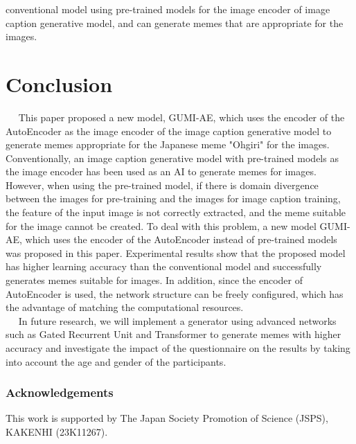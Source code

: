 \documentclass[runningheads]{llncs}
\begin{document}
conventional model using pre-trained models for the image encoder of image caption generative model, and can generate memes that are appropriate for the images.

\section{Conclusion}
~~ This paper proposed a new model, GUMI-AE, which uses the encoder of the AutoEncoder as the image encoder of the image caption generative model to generate memes appropriate for the Japanese meme "Ohgiri" for the images. Conventionally, an image caption generative model with pre-trained models as the image encoder has been used as an AI to generate memes for images. However, when using the pre-trained model, if there is domain divergence between the images for pre-training and the images for image caption training, the feature of the input image is not correctly extracted, and the meme suitable for the image cannot be created. To deal with this problem, a new model GUMI-AE, which uses the encoder of the AutoEncoder instead of pre-trained models was proposed in this paper. Experimental results show that the proposed model has higher learning accuracy than the conventional model and successfully generates memes suitable for images. In addition, since the encoder of AutoEncoder is used, the network structure can be freely configured, which has the advantage of matching the computational resources. \\
~~ In future research, we will implement a generator using advanced networks such as Gated Recurrent Unit and Transformer to generate memes with higher accuracy and investigate the impact of the questionnaire on the results by taking into account the age and gender of the participants.

\subsubsection{Acknowledgements}
This work is supported by The Japan Society Promotion of Science
(JSPS), KAKENHI (23K11267).
\end{document}
